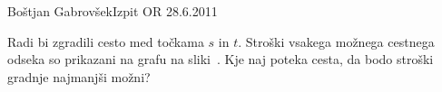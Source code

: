 \begin{naloga}{Boštjan Gabrovšek}{Izpit OR 28.6.2011}
\begin{vprasanje}
Radi bi zgradili cesto med točkama $s$ in $t$.
Stroški vsakega možnega cestnega odseka
so prikazani na grafu na sliki~\fig{}.
Kje naj poteka cesta, da bodo stroški gradnje najmanjši možni?

\begin{slika}
\pgfslika
{}
\end{slika}
\end{vprasanje}
\begin{odgovor}
\end{odgovor}
\end{naloga}
